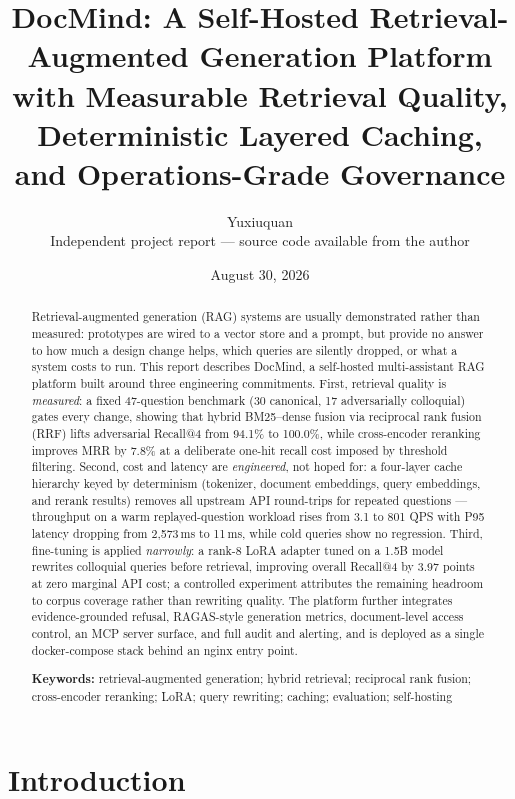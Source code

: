 \documentclass[11pt,a4paper]{article}
\title{\bfseries DocMind: A Self-Hosted Retrieval-Augmented Generation Platform
with Measurable Retrieval Quality, Deterministic Layered Caching, and
Operations-Grade Governance}
\author{Yuxiuquan \\ \small Independent project report --- source code available from the author}
\date{August 30, 2026}
\begin{document}
\maketitle

\begin{abstract}
Retrieval-augmented generation (RAG) systems are usually demonstrated rather than
measured: prototypes are wired to a vector store and a prompt, but provide no answer
to how much a design change helps, which queries are silently dropped, or what a
system costs to run. This report describes DocMind, a self-hosted multi-assistant RAG
platform built around three engineering commitments. First, retrieval quality is
\emph{measured}: a fixed 47-question benchmark (30 canonical, 17 adversarially
colloquial) gates every change, showing that hybrid BM25--dense fusion via reciprocal
rank fusion (RRF) lifts adversarial Recall@4 from 94.1\% to 100.0\%, while
cross-encoder reranking improves MRR by 7.8\% at a deliberate one-hit recall cost
imposed by threshold filtering. Second, cost and latency are \emph{engineered}, not
hoped for: a four-layer cache hierarchy keyed by determinism (tokenizer, document
embeddings, query embeddings, and rerank results) removes all upstream API
round-trips for repeated questions --- throughput on a warm replayed-question workload
rises from 3.1 to 801 QPS with P95 latency dropping from 2{,}573\,ms to 11\,ms, while
cold queries show no regression. Third, fine-tuning is applied \emph{narrowly}: a
rank-8 LoRA adapter tuned on a 1.5B model rewrites colloquial queries before
retrieval, improving overall Recall@4 by 3.97 points at zero marginal API cost; a
controlled experiment attributes the remaining headroom to corpus coverage rather than
rewriting quality. The platform further integrates evidence-grounded refusal,
RAGAS-style generation metrics, document-level access control, an MCP server surface,
and full audit and alerting, and is deployed as a single docker-compose stack behind
an nginx entry point.

\medskip
\noindent\textbf{Keywords:} retrieval-augmented generation; hybrid retrieval;
reciprocal rank fusion; cross-encoder reranking; LoRA; query rewriting; caching;
evaluation; self-hosting
\end{abstract}

\section{Introduction}\label{sec:intro}
\end{document}
